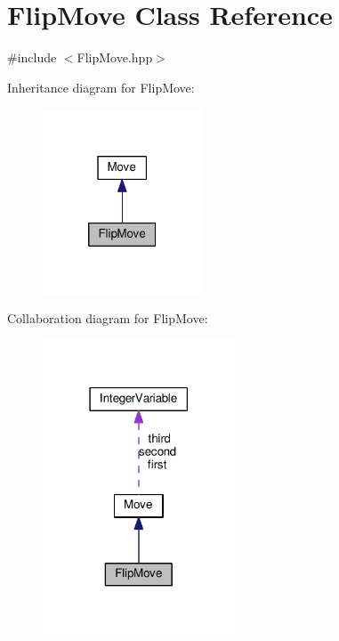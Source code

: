 \hypertarget{class_flip_move}{\section{Flip\-Move Class Reference}
\label{class_flip_move}
}


{\ttfamily \#include $<$Flip\-Move.\-hpp$>$}



Inheritance diagram for Flip\-Move\-:\nopagebreak
\begin{figure}[H]
\begin{center}
\leavevmode
\includegraphics[width=134pt]{class_flip_move__inherit__graph}
\end{center}
\end{figure}


Collaboration diagram for Flip\-Move\-:\nopagebreak
\begin{figure}[H]
\begin{center}
\leavevmode
\includegraphics[width=162pt]{class_flip_move__coll__graph}
\end{center}
\end{figure}
